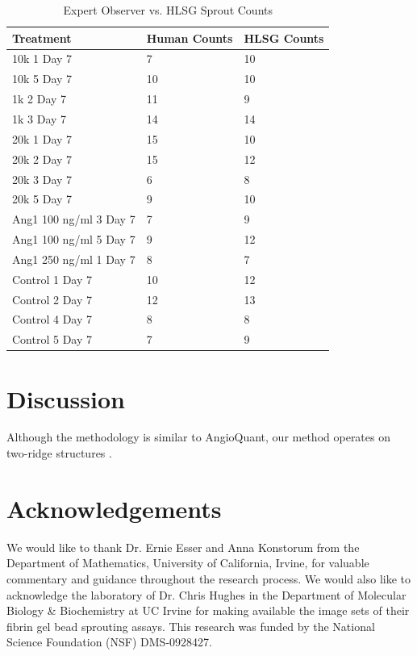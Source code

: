 \documentclass{sig-alternate}
\begin{document}
	\begin{table}[htp]
		\centering
		\begin{tabular}{| l | l | l |}
			\hline
			\textbf{Treatment} & \textbf{Human Counts} & \textbf{HLSG Counts} \\\hline
			10k 1 Day 7 & 7  & 10 \\\hline
			10k 5 Day 7 & 10 &  10 \\\hline
			1k 2 Day 7 & 11 & 9 \\\hline
			1k 3 Day 7 & 14 & 14 \\\hline
			20k 1 Day 7 & 15 & 10 \\\hline
			20k 2 Day 7 & 15 & 12 \\\hline
			20k 3 Day 7 & 6 & 8 \\\hline
			20k 5 Day 7 & 9 & 10 \\\hline
			Ang1 100 ng/ml 3 Day 7 & 7 & 9 \\\hline
			Ang1 100 ng/ml 5 Day 7 & 9 & 12 \\\hline
			Ang1 250 ng/ml 1 Day 7 & 8 & 7\\\hline
			Control 1 Day 7 & 10 & 12 \\\hline
			Control 2 Day 7 & 12 & 13 \\\hline
			Control 4 Day 7 & 8 & 8 \\\hline
			Control 5 Day 7 & 7 & 9 \\\hline
		\end{tabular}
		\caption{Expert Observer vs. HLSG Sprout Counts}
		\label{tab:resultcomp}
	\end{table}

\section{Discussion} %
\label{sec:Discussion}
	Although the methodology is similar to AngioQuant, our method operates on
	two-ridge structures \cite{niemisto05}.

\section{Acknowledgements} %
\label{sec:Acknowledgements}
	We would like to thank Dr. Ernie Esser and Anna Konstorum from the
	Department of Mathematics, University of California, Irvine, for
	valuable commentary and guidance throughout the research process. We
	would also like to acknowledge the laboratory of Dr. Chris Hughes in
	the Department of Molecular Biology \& Biochemistry at UC Irvine for
	making available the image sets of their fibrin gel bead sprouting
	assays. This research was funded by the National Science Foundation
	(NSF) DMS-0928427.
\end{document}
